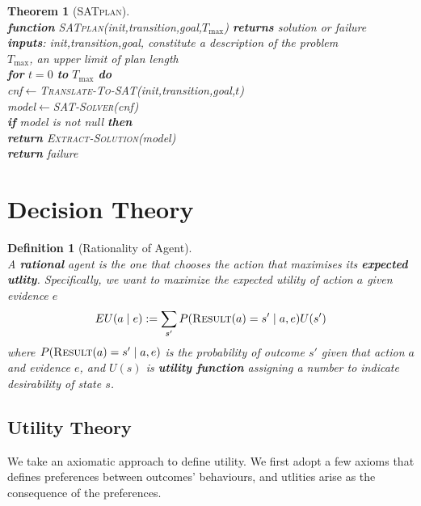 \documentclass[12pt]{article}
\newcommand{\ind}{\hspace*{15pt}}
\newtheorem{definition}{Definition}[section]
\newtheorem{theorem}{Theorem}[section]
\theoremstyle{definition}
\begin{document}
\begin{theorem}[{\textsc{SATplan}}]
\hfill\\\normalfont
\textbf{function} \textsc{SATplan}(\textit{init},\textit{transition},\textit{goal},$T_{\max}$) \textbf{returns} solution or failure\\
\ind\textbf{inputs}: \textit{init},\textit{transition},\textit{goal}, constitute a description of the problem\\
\ind$T_{\max}$, an upper limit of plan length\\

\ind\textbf{for} $t=0$ \textbf{to} $T_{\max}$ \textbf{do}\\
\ind\ind\textit{cnf}$\leftarrow$\textsc{Translate-To-SAT}(\textit{init},\textit{transition},\textit{goal},$t$)\\
\ind\ind\textit{model}$\leftarrow$\textsc{SAT-Solver}(\textit{cnf})\\
\ind\ind\textbf{if} \textit{model} is not null \textbf{then}\\
\ind\ind\ind\textbf{return} \textsc{Extract-Solution}(\textit{model})\\
\ind\textbf{return} \textit{failure}
\end{theorem}

\section{Decision Theory}
\begin{definition}[Rationality of Agent]
\hfill\\\normalfont A \textbf{rational} agent is the one that chooses the action that maximises its \textbf{expected utlity}. Specifically, we want to maximize the expected utility of action $a$ given evidence $e$
\[
EU(a\mid e) := \sum_{s'} P(\textsc{Result}(a)=s'\mid a,e)U(s')
\]
where $P(\textsc{Result}(a)=s'\mid a,e)$ is the probability of outcome $s'$ given that action $a$ and evidence $e$, and $U(s)$ is \textbf{utility function} assigning a number to indicate desirability of state $s$.
\end{definition}
\subsection{Utility Theory}
We take an axiomatic approach to define utility. We first adopt a few axioms that defines preferences between outcomes' behaviours, and utlities arise as the consequence of the preferences.
\end{document}
